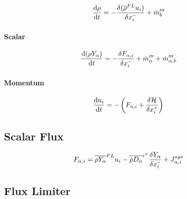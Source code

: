 \documentclass[11pt]{article}
\begin{document}
\begin{equation}
\label{eqn_mass_ode}
\frac{\mathrm{d} \rho}{\mathrm{d} t} = -\frac{\delta (\overline{\rho}^{\tiny FL} u_i)}{\delta x_i^{\scriptscriptstyle -}} + \dot{m}_b^{\prime\prime\prime}
\end{equation}

\paragraph{Scalar}

\begin{equation}
\label{eqn_scalar_ode}
\frac{\mathrm{d} (\rho Y_\alpha)}{\mathrm{d} t} = -\frac{\delta F_{\alpha,i}}{\delta x_i^{\scriptscriptstyle -}} + \dot{m}_\alpha^{\prime\prime\prime} + \dot{m}_{\alpha,b}^{\prime\prime\prime}
\end{equation}

\paragraph{Momentum}

\begin{equation}
\label{eqn_scalar_ode}
\frac{\mathrm{d} u_i}{\mathrm{d} t} = - \left( F_{u,i} + \frac{\delta \cal H}{\delta x_i^{\scriptscriptstyle +}} \right)
\end{equation}

\subsection{Scalar Flux}

\begin{equation}
\label{eqn_flux}
F_{\alpha,i} = \overline{\rho Y_\alpha}^{\tiny FL} u_i - \overline{\rho D_\alpha}^{i^+} \frac{\delta Y_\alpha}{\delta x_i^{\scriptscriptstyle +}} + J_{\alpha,i}^{sgs}
\end{equation}

\subsection{Flux Limiter}
\end{document}
